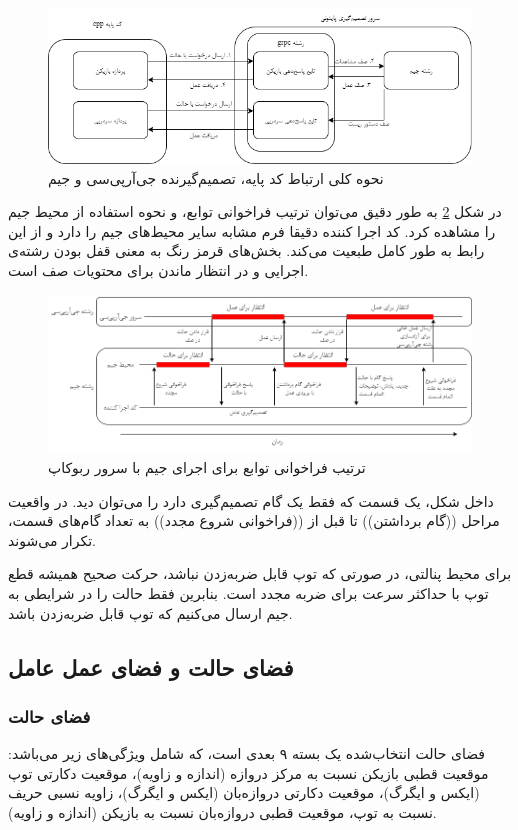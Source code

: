 \begin{figure}[H]
    \centering
    \includegraphics[width=1\textwidth]{images/grpc_gym.png}
    \caption{نحوه کلی ارتباط کد پایه، تصمیم‌گیرنده جی‌آر‌پی‌سی و جیم}\label{fig:gym_grpc}
\end{figure}
در شکل \ref{fig:gym_timing}
به طور دقیق می‌توان ترتیب فراخوانی توابع، و نحوه استفاده از محیط جیم را مشاهده کرد.
کد اجرا کننده 
دقیقا فرم مشابه سایر محیط‌های جیم را دارد و از این رابط به طور کامل طبعیت می‌کند.
بخش‌های قرمز رنگ به معنی قفل بودن رشته‌ی اجرایی و در انتظار ماندن برای محتویات صف است.
\begin{figure}[H]
    \centering
    \includegraphics[width=1\textwidth]{images/timing.drawio.png}
    \caption{ترتیب فراخوانی توابع برای اجرای جیم با سرور ربوکاپ}\label{fig:gym_timing}
\end{figure}

داخل شکل، یک قسمت که فقط یک گام تصمیم‌گیری دارد را می‌توان دید. در واقعیت مراحل ((گام برداشتن))
تا قبل از ((فراخوانی شروع مجدد))
به تعداد گام‌های قسمت، تکرار می‌شوند.

برای محیط پنالتی، در صورتی که توپ قابل ضربه‌زدن نباشد، حرکت صحیح همیشه قطع توپ با حداکثر سرعت برای ضربه مجدد است. بنابرین فقط حالت را در شرایطی به جیم ارسال می‌کنیم که توپ قابل ضربه‌زدن باشد.
\subsection{فضای حالت و فضای عمل عامل}
\subsubsection{فضای حالت}
فضای حالت انتخاب‌شده یک بسته ۹ بعدی است، که شامل ویژگی‌های زیر می‌باشد: موقعیت قطبی بازیکن نسبت به مرکز دروازه (اندازه و زاویه)،
موقعیت دکارتی توپ‌ (ایکس و ایگرگ)،
موقعیت دکارتی دروازه‌بان (ایکس و ایگرگ)،
زاویه نسبی حریف نسبت به توپ،
موقعیت قطبی دروازه‌بان نسبت به بازیکن (اندازه و زاویه).

